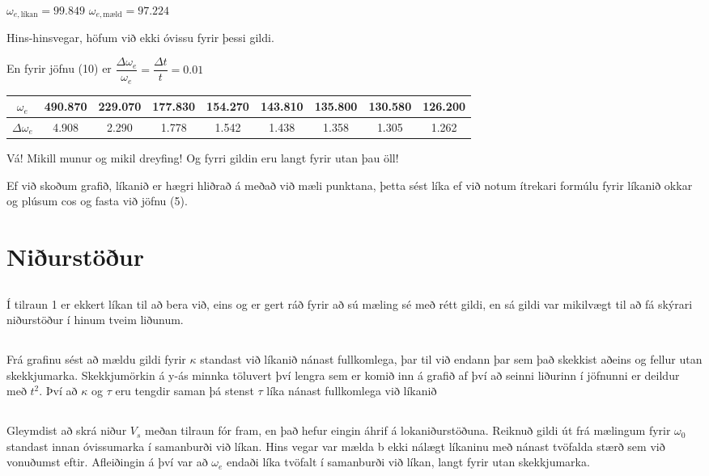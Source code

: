 \documentclass[12pt]{article}
\begin{document}
$\omega_{e,\text{líkan}} = 99.849$
\qquad
$\omega_{e,\text{mæld}} = 97.224$

Hins-hinsvegar, höfum við ekki óvissu fyrir þessi gildi.

En fyrir jöfnu (10) er $\dfrac{\Delta \omega_e}{\omega_e} = \dfrac{\Delta t}{t} = 0.01$


\begin{table}[H]
    \begin{tabular}{|c|c|c|c|c|c|c|c|c|}
		$ \omega_e $ & 490.870 & 229.070 & 177.830 & 154.270 & 143.810 & 135.800 & 130.580 & 126.200  \\
		\hline
		$\Delta \omega_e$ &	4.908 & 2.290 & 1.778 & 1.542 & 1.438 & 1.358 & 1.305 & 1.262  \\
    \end{tabular}
\end{table}

Vá! Mikill munur og mikil dreyfing! 
Og fyrri gildin eru langt fyrir utan þau öll!

Ef við skoðum grafið, líkanið er hægri hliðrað á meðað við mæli punktana, þetta sést líka ef við notum ítrekari formúlu fyrir líkanið okkar og plúsum cos og fasta við jöfnu (5). 


\section{Niðurstöður}

\subsection{}
Í tilraun 1 er ekkert líkan til að bera við, eins og er gert ráð fyrir að sú mæling sé með rétt gildi, 
en sá gildi var mikilvægt til að fá skýrari niðurstöður í hinum tveim liðunum.

\subsection{}
Frá grafinu sést að mældu gildi fyrir $ \kappa $ standast við líkanið nánast fullkomlega, þar til við endann þar
sem það skekkist aðeins og fellur utan skekkjumarka. Skekkjumörkin á y-ás minnka töluvert því lengra sem er 
komið inn á grafið af því að seinni liðurinn í jöfnunni er deildur með $ t^2 $. Því að $ \kappa $ og $ \tau $ eru
tengdir saman þá stenst $ \tau $ líka nánast fullkomlega við líkanið

\subsection{}
Gleymdist að skrá niður $ V_s $ meðan tilraun fór fram, en það hefur eingin áhrif á lokaniðurstöðuna. 
Reiknuð gildi út frá mælingum fyrir $\omega_0$ standast innan óvissumarka í samanburði við líkan. 
Hins vegar var mælda b ekki nálægt líkaninu með nánast tvöfalda stærð sem við vonuðumst eftir.
Afleiðingin á því var að $\omega_e$ endaði líka tvöfalt í samanburði við líkan, langt fyrir utan skekkjumarka. 
\end{document}
